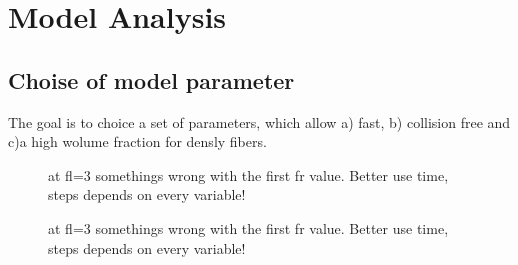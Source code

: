 \setcounter{chapter}{6}
\chapter{Model Analysis}
\label{cha:model_analysis}
% 
\section{Choise of model parameter}
% 
The goal is to choice a set of parameters, which allow a) fast, b) collision free and c)a high wolume fraction for densly fibers. 
% 
\begin{figure}[!tb]
\centering
{}
\caption{at fl=3 somethings wrong with the first fr value.
Better use time, steps depends on every variable!}
\end{figure}
% 
% 
\begin{figure}[!tb]
\centering
{}
\caption{at fl=3 somethings wrong with the first fr value.
Better use time, steps depends on every variable!}
\end{figure}
% 
% 
